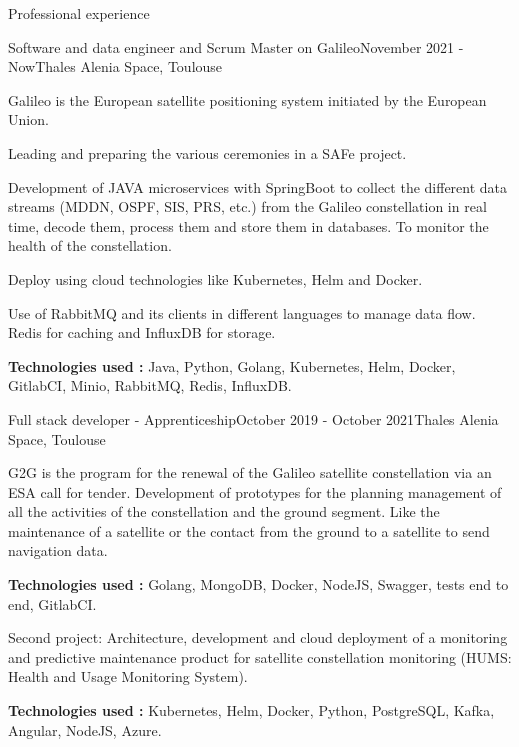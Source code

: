 \documentclass[
	11pt, %
]{resume}
\begin{document}
\begin{rSection}{Professional experience}

	\begin{rSubsection}{Software and data engineer and Scrum Master on Galileo}{November 2021 - Now}{Thales Alenia Space, Toulouse}{}
		\item Galileo is the European satellite positioning system initiated by the European Union. 
		\item Leading and preparing the various ceremonies in a SAFe project.
		\item Development of JAVA microservices with SpringBoot to collect the different data streams (MDDN, OSPF, SIS, PRS, etc.) from the Galileo constellation in real time, decode them, process them and store them in databases. To monitor the health of the constellation.
 		\item Deploy using cloud technologies like Kubernetes, Helm and Docker.
 		\item Use of RabbitMQ and its clients in different languages to manage data flow. Redis for caching and InfluxDB for storage.
		\item \textbf{Technologies used :} Java, Python, Golang, Kubernetes, Helm, Docker, GitlabCI, Minio, RabbitMQ, Redis, InfluxDB.
	\end{rSubsection}

	\begin{rSubsection}{Full stack developer - Apprenticeship}{October 2019 - October 2021}{Thales Alenia Space, Toulouse}{}
		\item G2G is the program for the renewal of the Galileo satellite constellation via an ESA call for tender. 
			Development of prototypes for the planning management of all the activities of the constellation and the ground segment. 
			Like the maintenance of a satellite or the contact from the ground to a satellite to send navigation data.
		\item \textbf{Technologies used :} Golang, MongoDB, Docker, NodeJS, Swagger, tests end to end, GitlabCI.
		\item Second project: Architecture, development and cloud deployment of a monitoring and predictive maintenance 
			product for satellite constellation monitoring (HUMS: Health and Usage Monitoring System).
		\item \textbf{Technologies used :} Kubernetes, Helm, Docker, Python, PostgreSQL, Kafka, Angular, NodeJS, Azure.
	\end{rSubsection}


\end{rSection}
\end{document}
